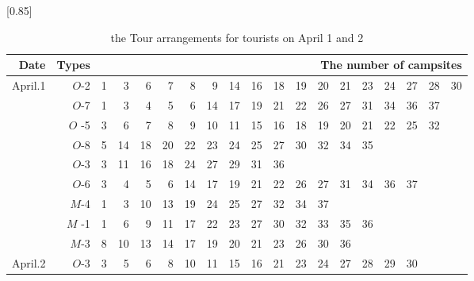 	\begin{table}[H]
		\centering
		\caption{the Tour arrangements for tourists on April 1 and 2 
		}
		\scalebox{0.85}[0.85]{
			\begin{tabular}{|r|r|r|r|r|r|r|r|r|r|r|r|r|r|r|r|r|r|r|}
				\toprule
				\multicolumn{1}{|p{1em}|}{Date} & \multicolumn{1}{p{2em}|}{Types} & \multicolumn{17}{p{25em}|}{\centering The number of campsites} \\
				\midrule
				\multicolumn{1}{|r|}{\multirow{9}[18]{*}{April.1}} &  $O$-2    & 1     & 3     & 6     & 7     & 8     & 9     & 14    & 16    & 18    & 19    & 20    & 21    & 23    & 24    & 27    & 28    & 30 \\
				\cmidrule{2-19}         & $O$-7    & 1     & 3     & 4     & 5     & 6     & 14    & 17    & 19    & 21    & 22    & 26    & 27    & 31    & 34    & 36    & 37    &  \\
				\cmidrule{2-19}          &$O$ -5    & 3     & 6     & 7     & 8     & 9     & 10    & 11    & 15    & 16    & 18    & 19    & 20    & 21    & 22    & 25    & 32    &  \\
				\cmidrule{2-19}          & $O$-8    & 5     & 14    & 18    & 20    & 22    & 23    & 24    & 25    & 27    & 30    & 32    & 34    & 35    &       &       &       &  \\
				\cmidrule{2-19}          & $O$-3    & 3     & 11    & 16    & 18    & 24    & 27    & 29    & 31    & 36    &       &       &       &       &       &       &       &  \\
				\cmidrule{2-19}          & $O$-6    & 3     & 4     & 5     & 6     & 14    & 17    & 19    & 21    & 22    & 26    & 27    & 31    & 34    & 36    & 37    &       &  \\
				\cmidrule{2-19}          & $M$-4    & 1     & 3     & 10    & 13    & 19    & 24    & 25    & 27    & 32    & 34    & 37    &       &       &       &       &       &  \\
				\cmidrule{2-19}          &$M$ -1    & 1     & 6     & 9     & 11    & 17    & 22    & 23    & 27    & 30    & 32    & 33    & 35    & 36    &       &       &       &  \\
				\cmidrule{2-19}          & $M$-3    & 8     & 10    & 13    & 14    & 17    & 19    & 20    & 21    & 23    & 26    & 30    & 36    &       &       &       &       &  \\
				\midrule
				\multicolumn{1}{|r|}{\multirow{11}[22]{*}{April.2}} & $O$-3    & 3     & 5     & 6     & 8     & 10    & 11    & 15    & 16    & 21    & 23    & 24    & 27    & 28    & 29    & 30    &       &  \\

\end{tabular}}
\end{table}

